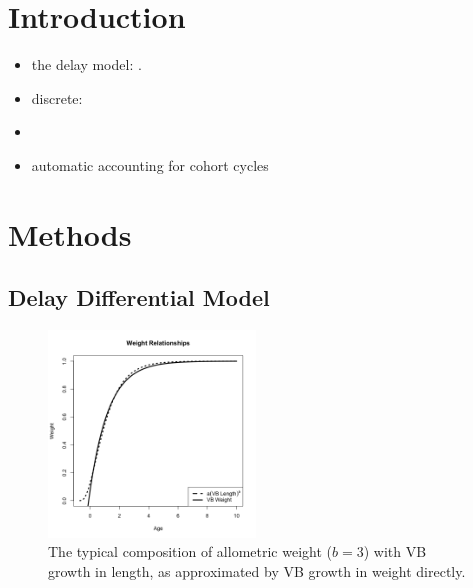 %
\clearpage

%
\section{Introduction}

%
\begin{itemize}
\item the delay model:   .
\item discrete: 
\item {} 
\item automatic accounting for cohort cycles
\end{itemize}

%
\section{Methods}

%
\subsection{Delay Differential Model}

%
\begin{figure} %
\vspace{-1cm}
\includegraphics[width=0.49\textwidth]{plots/vbOpt.png}
\vspace{-1cm}
\caption{
The typical composition of allometric weight ($b=3$) with VB growth in length, as 
approximated by VB growth in weight directly. 
}
\label{SrrPT}
\end{figure}

